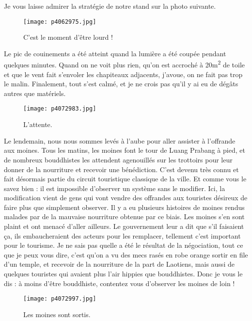 \documentclass{book}
\begin{document}
Je vous laisse admirer la stratégie de notre stand sur la photo suivante.


\begin{figure}[h]
\centering
\texttt{[image: p4062975.jpg]}
\caption*{C'est le moment d'être lourd !}
\end{figure}

Le pic de couinements a été atteint quand la lumière a été coupée pendant quelques minutes. Quand on ne voit plus rien, qu'on est accroché à 20m\textsuperscript{2} de toile et que le vent fait s'envoler les chapiteaux adjacents, j'avoue, on ne fait pas trop le malin. Finalement, tout s'est calmé, et je ne crois pas qu'il y ai eu de dégâts autres que matériels.


\begin{figure}[h]
\centering
\texttt{[image: p4072983.jpg]}
\caption*{L'attente.}
\end{figure}

Le lendemain, nous nous sommes levés à l'aube pour aller assister à l'offrande aux moines. Tous les matins, les moines font le tour de Luang Prabang à pied, et de nombreux bouddhistes les attendent agenouillés sur les trottoirs pour leur donner de la nourriture et recevoir une bénédiction. C'est devenu très connu et fait désormais partie du circuit touristique classique de la ville. Et comme vous le savez bien : il est impossible d'observer un système sans le modifier. Ici, la modification vient de gens qui vont vendre des offrandes aux touristes désireux de faire plus que simplement observer. Il y a eu plusieurs histoires de moines rendus malades par de la mauvaise nourriture obtenue par ce biais. Les moines s'en sont plaint et ont menacé d'aller ailleurs. Le gouvernement leur a dit que s'il faisaient ça, ils embaucheraient des acteurs pour les remplacer, tellement c'est important pour le tourisme. Je ne sais pas quelle a été le résultat de la négociation, tout ce que je peux vous dire, c'est qu'on a vu des mecs rasés en robe orange sortir en file d'un temple, et recevoir de la nourriture de la part de Laotiens, mais aussi de quelques touristes qui avaient plus l'air hippies que bouddhistes. Donc je vous le dis : à moins d'être bouddhiste, contentez vous d'observer les moines de loin !


\begin{figure}[h]
\centering
\texttt{[image: p4072997.jpg]}
\caption*{Les moines sont sortis.}
\end{figure}
\end{document}
